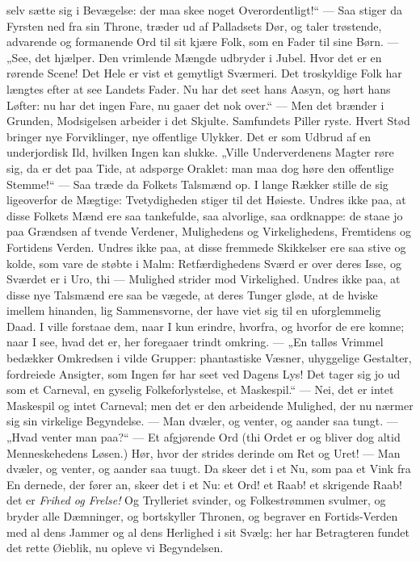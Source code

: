 \documentclass[12pt,a4paper]{book}
\begin{document}
selv sætte sig i Bevægelse: der maa skee noget Overordentligt!“ --- Saa stiger da
Fyrsten ned fra sin Throne, træder ud af Palladsets Dør, og taler trøstende,
advarende og formanende Ord til sit kjære Folk, som en Fader til sine Børn. ---
„See, det hjælper. Den vrimlende Mængde udbryder i Jubel. Hvor det er en rørende
Scene! Det Hele er vist et gemytligt Sværmeri. Det troskyldige Folk har længtes
efter at see Landets Fader. Nu har det seet hans Aasyn, og hørt hans Løfter: nu
har det ingen Fare, nu gaaer det nok over.“ --- Men det brænder i Grunden,
Modsigelsen arbeider i det Skjulte. Samfundets Piller ryste. Hvert Stød bringer
nye Forviklinger, nye offentlige Ulykker. Det er som Udbrud af en underjordisk
Ild, hvilken Ingen kan slukke. „Ville Underverdenens Magter røre sig, da er det
paa Tide, at adspørge Oraklet: man maa dog høre den offentlige Stemme!“ --- Saa
træde da Folkets Talsmænd op. I lange Rækker stille de sig ligeoverfor de
Mægtige: Tvetydigheden stiger til det Høieste. Undres ikke paa, at disse Folkets
Mænd ere saa tankefulde, saa alvorlige, saa ordknappe: de staae jo paa Grændsen
af tvende Verdener, Mulighedens og Virkelighedens, Fremtidens og Fortidens
Verden. Undres ikke paa, at disse fremmede Skikkelser ere saa stive og kolde, som
vare de støbte i Malm: Retfærdighedens Sværd er over deres Isse, og Sværdet er i
Uro, thi --- Mulighed strider mod Virkelighed. Undres ikke paa, at disse nye
Talsmænd ere saa be\-%
vægede, at deres Tunger gløde, at de hviske imellem hinanden, lig Sammensvorne,
der have viet sig til en uforglemmelig Daad. I ville forstaae dem, naar I kun
erindre, hvorfra, og hvorfor de ere komne; naar I see, hvad det er, her foregaaer
trindt omkring. --- „En talløs Vrimmel bedækker Omkredsen i vilde Grupper:
phantastiske Væsner, uhyggelige Gestalter, fordreiede Ansigter, som Ingen før har
seet ved Dagens Lys! Det tager sig jo ud som et Carneval, en gyselig
Folkeforlystelse, et Maskespil.“ --- Nei, det er intet Maskespil og intet
Carneval; men det er den arbeidende Mulighed, der nu nærmer sig sin virkelige
Begyndelse. --- Man dvæler, og venter, og aander saa tungt. --- „Hvad venter man
paa?“ --- Et afgjørende Ord (thi Ordet er og bliver dog altid Menneskehedens
Løsen.) Hør, hvor der strides derinde om Ret og Uret! --- Man dvæler, og venter,
og aander saa tuugt.
Da skeer det i et Nu, som paa et Vink fra En dernede, der fører an, skeer det i
et Nu: et Ord! et Raab! et skrigende Raab! det er \emph{Frihed og Frelse!} Og
Trylleriet svinder, og Folkestrømmen svulmer, og bryder alle Dæmninger, og
bortskyller Thronen, og begraver en Fortids-Verden med al dens Jammer og al dens
Herlighed i sit Svælg: her har Betragteren fundet det rette Øieblik, nu opleve vi
Begyndelsen.
\end{document}
